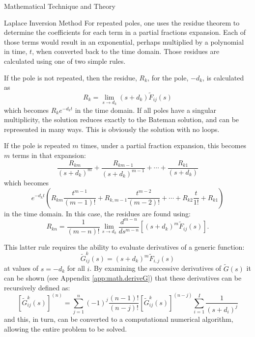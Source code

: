 \begin{chapter}{Mathematical Technique and Theory}
\begin{section}{Laplace Inversion Method}
  For repeated poles, one uses the residue theorem to determine the
  coefficients for each term in a partial fractions expansion.  Each
  of those terms would result in an exponential, perhaps multiplied by
  a polynomial in time, $t$, when converted back to the time domain.
  Those residues are calculated using one of two simple rules.
  
  If the pole is not repeated, then the residue, $R_k$, for the pole,
  $-d_k$, is calculated as
  \begin{equation}
    R_k = \lim_{s\rightarrow d_k} (s+d_k) \tilde{F}_{ij}(s)
  \end{equation}
  which becomes $R_k e^{-d_kt}$ in the time domain.  If all poles have a
  singular multiplicity, the solution reduces exactly to the Bateman
  solution, and can be represented in many ways.  This is obviously the
  solution with no loops.
  
  If the pole is repeated $m$ times, under a partial fraction
  expansion, this becomes $m$ terms in that expansion:
  \begin{equation}
    \frac{R_{km}}{(s+d_k)^m} + \frac{R_{km-1}}{(s+d_k)^{m-1}} +\cdots + \frac{R_{k1}}{(s+d_k)}
  \end{equation}
  which becomes 
  \begin{equation}
    e^{-d_kt} \left ( R_{km} \frac{t^{m-1}}{(m-1)!} + R_{k,m-1}
      \frac{t^{m-2}}{(m-2)!} + \cdots + R_{k2} \frac{t}{1!} + R_{k1} \right )
  \end{equation}
  in the time domain.  In this case, the residues are found using:
  \begin{equation}
    R_{kn} = \frac{1}{(m-n)!} \lim_{s\rightarrow d_k}
    \frac{d^{m-n}}{ds^{m-n}} \left [ (s+d_k)^m \tilde{F}_{ij}(s) \right].
  \end{equation}
  
  This latter rule requires the ability to evaluate derivatives of a
  generic function:
  \begin{equation}
    \tilde{G}_{ij}^k(s) = (s+d_k)^m \tilde{F}_{i,j}(s)
  \end{equation}
  at values of $s = -d_k$ for all $i$.  By examining the successive
  derivatives of $\tilde{G}(s)$ it can be shown (see Appendix
  \ref{app:math.deriveG}) that these derivatives can be recursively
  defined as:
  \begin{equation}
    \left[\tilde{G}_{ij}^k(s)\right]^{(n)} = \sum_{j=1}^n(-1)^j
    \frac{(n-1)!}{(n-j)!}\left[\tilde{G}_{ij}^k(s)\right]^{(n-j)}
    \sum_{i=1}^I \frac{1}{(s+d_i)^j}
  \end{equation}
  and this, in turn, can be converted to a computational numerical
  algorithm, allowing the entire problem to be solved.
  

\end{section}
\end{chapter}

